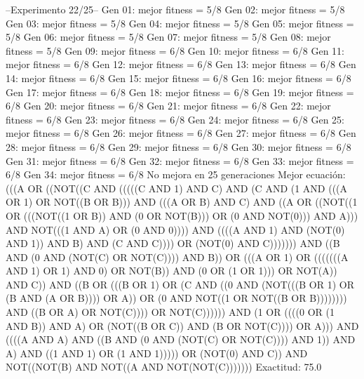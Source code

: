 --Experimento 
 22/25--
Gen 01: mejor fitness = 5/8
Gen 02: mejor fitness = 5/8
Gen 03: mejor fitness = 5/8
Gen 04: mejor fitness = 5/8
Gen 05: mejor fitness = 5/8
Gen 06: mejor fitness = 5/8
Gen 07: mejor fitness = 5/8
Gen 08: mejor fitness = 5/8
Gen 09: mejor fitness = 6/8
Gen 10: mejor fitness = 6/8
Gen 11: mejor fitness = 6/8
Gen 12: mejor fitness = 6/8
Gen 13: mejor fitness = 6/8
Gen 14: mejor fitness = 6/8
Gen 15: mejor fitness = 6/8
Gen 16: mejor fitness = 6/8
Gen 17: mejor fitness = 6/8
Gen 18: mejor fitness = 6/8
Gen 19: mejor fitness = 6/8
Gen 20: mejor fitness = 6/8
Gen 21: mejor fitness = 6/8
Gen 22: mejor fitness = 6/8
Gen 23: mejor fitness = 6/8
Gen 24: mejor fitness = 6/8
Gen 25: mejor fitness = 6/8
Gen 26: mejor fitness = 6/8
Gen 27: mejor fitness = 6/8
Gen 28: mejor fitness = 6/8
Gen 29: mejor fitness = 6/8
Gen 30: mejor fitness = 6/8
Gen 31: mejor fitness = 6/8
Gen 32: mejor fitness = 6/8
Gen 33: mejor fitness = 6/8
Gen 34: mejor fitness = 6/8
No mejora en 25 generaciones
Mejor ecuación: (((A OR ((NOT((C AND (((((C AND 1) AND C) AND (C AND (1 AND (((A OR 1) OR NOT((B OR B))) AND (((A OR B) AND C) AND ((A OR ((NOT((1 OR (((NOT((1 OR B)) AND (0 OR NOT(B))) OR (0 AND NOT(0))) AND A))) AND NOT(((1 AND A) OR (0 AND 0)))) AND ((((A AND 1) AND (NOT(0) AND 1)) AND B) AND (C AND C)))) OR (NOT(0) AND C))))))) AND ((B AND (0 AND (NOT(C) OR NOT(C)))) AND B)) OR (((A OR 1) OR (((((((A AND 1) OR 1) AND 0) OR NOT(B)) AND (0 OR (1 OR 1))) OR NOT(A)) AND C)) AND ((B OR (((B OR 1) OR (C AND ((0 AND (NOT(((B OR 1) OR (B AND (A OR B)))) OR A)) OR (0 AND NOT((1 OR NOT((B OR B)))))))) AND ((B OR A) OR NOT(C)))) OR NOT(C)))))) AND (1 OR ((((0 OR (1 AND B)) AND A) OR (NOT((B OR C)) AND (B OR NOT(C)))) OR A))) AND ((((A AND A) AND ((B AND (0 AND (NOT(C) OR NOT(C)))) AND 1)) AND A) AND ((1 AND 1) OR (1 AND 1))))) OR (NOT(0) AND C)) AND NOT((NOT(B) AND NOT((A AND NOT(NOT(C)))))))
 Exactitud: 75.0%

